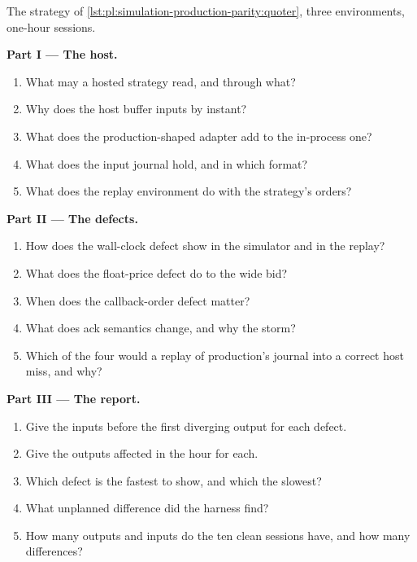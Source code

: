 \begin{problem}\label{pb:pl:simulation-production-parity:1}
The strategy of \cref{lst:pl:simulation-production-parity:quoter}, three environments, one-hour sessions.

\medskip\noindent\textbf{Part I --- The host.}
\begin{enumerate}
\item What may a hosted strategy read, and through what?
\item Why does the host buffer inputs by instant?
\item What does the production-shaped adapter add to the in-process one?
\item What does the input journal hold, and in which format?
\item What does the replay environment do with the strategy's orders?
\end{enumerate}

\medskip\noindent\textbf{Part II --- The defects.}
\begin{enumerate}[resume]
\item How does the wall-clock defect show in the simulator and in the replay?
\item What does the float-price defect do to the wide bid?
\item When does the callback-order defect matter?
\item What does ack semantics change, and why the storm?
\item Which of the four would a replay of production's journal into a correct host miss, and why?
\end{enumerate}

\medskip\noindent\textbf{Part III --- The report.}
\begin{enumerate}[resume]
\item Give the inputs before the first diverging output for each defect.
\item Give the outputs affected in the hour for each.
\item Which defect is the fastest to show, and which the slowest?
\item What unplanned difference did the harness find?
\item How many outputs and inputs do the ten clean sessions have, and how many differences?
\end{enumerate}


\end{problem}
